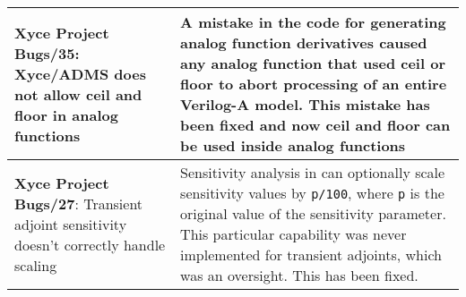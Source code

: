 {\begin{longtable}[h] {>{\raggedright\small}m{2in}|>{\raggedright\let\\\tabularnewline\small}m{3.5in}}
  \textbf{Xyce Project Bugs/35}: Xyce/ADMS does not allow ceil and
  floor in analog functions & A mistake in the code for generating
  analog function derivatives caused any analog function that used
  ceil or floor to abort processing of an entire Verilog-A model.
  This mistake has been fixed and now ceil and floor can be used
  inside analog functions \\ \hline

  \textbf{Xyce Project Bugs/27}: Transient adjoint sensitivity doesn't
  correctly handle scaling & Sensitivity analysis in \Xyce{} can
  optionally scale sensitivity values by \texttt{p/100},
  where \texttt{p} is the original value of the sensitivity parameter.
  This particular capability was never implemented for transient
  adjoints, which was an oversight.  This has been fixed.  \\ \hline

\end{longtable}
}
